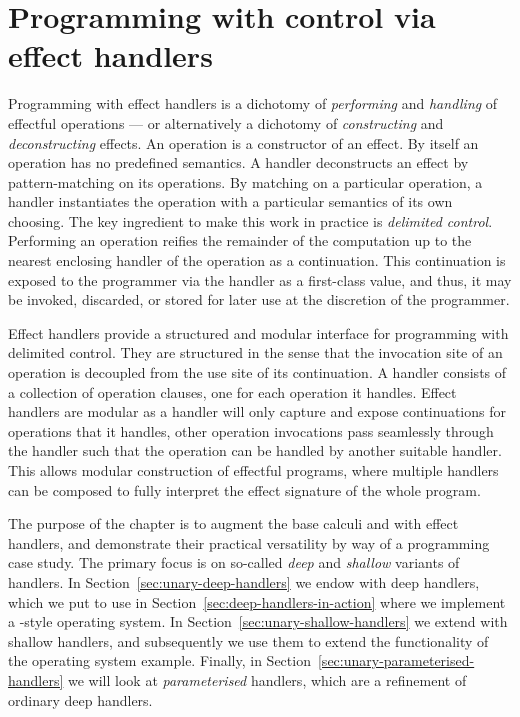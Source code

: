 \documentclass[12pt,phd,lfcs,twoside,openright,logo,leftchapter,normalheadings]{infthesis}
\theoremstyle{plain}
\theoremstyle{definition}
\begin{document}
\chapter{Programming with control via effect handlers}
\label{ch:unary-handlers}
%
Programming with effect handlers is a dichotomy of \emph{performing}
and \emph{handling} of effectful operations --- or alternatively a
dichotomy of \emph{constructing} and \emph{deconstructing} effects. An
operation is a constructor of an effect. By itself an operation has no
predefined semantics. A handler deconstructs an effect by
pattern-matching on its operations. By matching on a particular
operation, a handler instantiates the operation with a particular
semantics of its own choosing. The key ingredient to make this work in
practice is \emph{delimited control}. Performing an operation reifies
the remainder of the computation up to the nearest enclosing handler
of the operation as a continuation. This continuation is exposed to
the programmer via the handler as a first-class value, and thus, it
may be invoked, discarded, or stored for later use at the discretion
of the programmer.

Effect handlers provide a structured and modular interface for
programming with delimited control. They are structured in the sense
that the invocation site of an operation is decoupled from the use
site of its continuation. A handler consists of a collection of
operation clauses, one for each operation it handles. Effect handlers
are modular as a handler will only capture and expose continuations
for operations that it handles, other operation invocations pass
seamlessly through the handler such that the operation can be handled
by another suitable handler. This allows modular construction of
effectful programs, where multiple handlers can be composed to fully
interpret the effect signature of the whole program.

%
The purpose of the chapter is to augment the base calculi \BCalc{} and
\BCalcRec{} with effect handlers, and demonstrate their practical
versatility by way of a programming case study. The primary focus is
on so-called \emph{deep} and \emph{shallow} variants of handlers. In
Section~\ref{sec:unary-deep-handlers} we endow \BCalc{} with deep
handlers, which we put to use in
Section~\ref{sec:deep-handlers-in-action} where we implement a
\UNIX{}-style operating system. In
Section~\ref{sec:unary-shallow-handlers} we extend \BCalcRec{} with
shallow handlers, and subsequently we use them to extend the
functionality of the operating system example. Finally, in
Section~\ref{sec:unary-parameterised-handlers} we will look at
\emph{parameterised} handlers, which are a refinement of ordinary deep
handlers.
\end{document}
